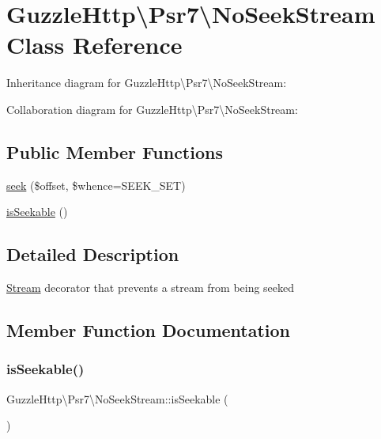 \hypertarget{classGuzzleHttp_1_1Psr7_1_1NoSeekStream}{}\section{Guzzle\+Http\textbackslash{}Psr7\textbackslash{}No\+Seek\+Stream Class Reference}
\label{classGuzzleHttp_1_1Psr7_1_1NoSeekStream}


Inheritance diagram for Guzzle\+Http\textbackslash{}Psr7\textbackslash{}No\+Seek\+Stream\+:


Collaboration diagram for Guzzle\+Http\textbackslash{}Psr7\textbackslash{}No\+Seek\+Stream\+:
\subsection*{Public Member Functions}
\begin{DoxyCompactItemize}
\item 
\hyperlink{classGuzzleHttp_1_1Psr7_1_1NoSeekStream_a615df46cc187cca2b0f9ffac86a1d83e}{seek} (\$offset, \$whence=S\+E\+E\+K\+\_\+\+S\+ET)
\item 
\hyperlink{classGuzzleHttp_1_1Psr7_1_1NoSeekStream_abf8fbb7645ade4f77b498208e31be38e}{is\+Seekable} ()
\end{DoxyCompactItemize}


\subsection{Detailed Description}
\hyperlink{classGuzzleHttp_1_1Psr7_1_1Stream}{Stream} decorator that prevents a stream from being seeked 

\subsection{Member Function Documentation}
\mbox{\label{classGuzzleHttp_1_1Psr7_1_1NoSeekStream_abf8fbb7645ade4f77b498208e31be38e}} 
\subsubsection{\texorpdfstring{is\+Seekable()}{isSeekable()}}
{\footnotesize\ttfamily Guzzle\+Http\textbackslash{}\+Psr7\textbackslash{}\+No\+Seek\+Stream\+::is\+Seekable (\begin{DoxyParamCaption}{ }\end{DoxyParamCaption})}

